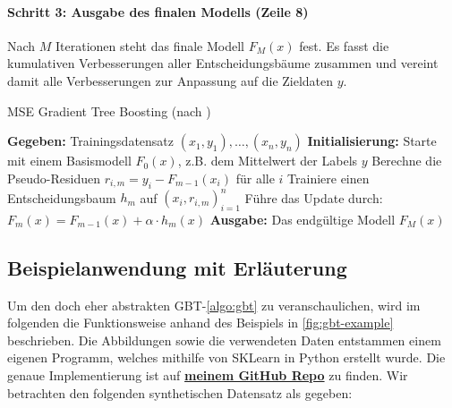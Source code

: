 \paragraph{Schritt 3: Ausgabe des finalen Modells (Zeile 8)}
Nach \( M \) Iterationen steht das finale Modell \( F_M(x) \) fest. Es fasst die kumulativen Verbesserungen aller Entscheidungsbäume zusammen und vereint damit alle Verbesserungen zur Anpassung auf die Zieldaten \(y\).

\begin{algorithm}[H]
    \caption[MSE Gradient Tree Boosting]{MSE Gradient Tree Boosting (nach \textcite[S.~346]{Frochte2020})}\label{algo:gbt}
    \begin{algorithmic}[1]
    \State \textbf{Gegeben:} Trainingsdatensatz \( (x_1,y_1), \dots, (x_n,y_n) \)
    \State \textbf{Initialisierung:} Starte mit einem Basismodell \( F_0(x) \), z.B. dem Mittelwert der Labels \( y \)
        \State Berechne die Pseudo-Residuen \( r_{i,m} = y_i - F_{m-1}(x_i) \) für alle \( i \)
        \State Trainiere einen Entscheidungsbaum \( h_m \) auf \( (x_i, r_{i,m})_{i=1}^n \)
        \State Führe das Update durch: \( F_m(x) = F_{m-1}(x) + \alpha \cdot h_m(x) \)
    \EndFor
    \State \textbf{Ausgabe:} Das endgültige Modell \( F_M(x) \)
    \end{algorithmic}
\end{algorithm}

\subsection{Beispielanwendung mit Erläuterung}
Um den doch eher abstrakten GBT-\autoref{algo:gbt} zu veranschaulichen, wird im folgenden die Funktionsweise anhand des Beispiels in \autoref{fig:gbt-example} beschrieben.
\newline
Die Abbildungen sowie die verwendeten Daten entstammen einem eigenen Programm, welches mithilfe von SKLearn in Python erstellt wurde. Die genaue Implementierung ist auf  \textbf{\href{https://github.com/CodeLtDave/Boosting-Algorithms-ML-Seminararbeit/blob/main/python-env/GBT-Example.ipynb}{meinem GitHub Repo}} zu finden. Wir betrachten den folgenden synthetischen Datensatz als gegeben:

